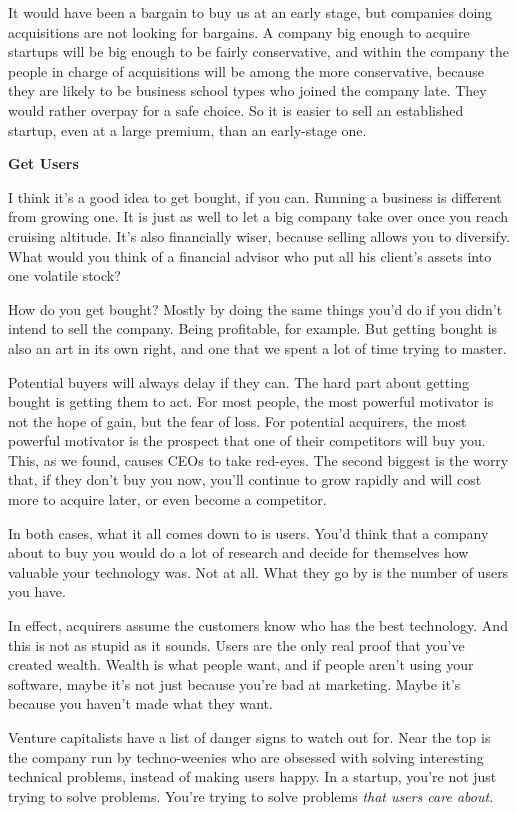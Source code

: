 It would have been a bargain to buy us at an early stage, but companies
doing acquisitions are not looking for bargains. A company big enough to
acquire startups will be big enough to be fairly conservative, and
within the company the people in charge of acquisitions will be among
the more conservative, because they are likely to be business school
types who joined the company late. They would rather overpay for a safe
choice. So it is easier to sell an established startup, even at a large
premium, than an early-stage one.

\textbf{Get Users}

I think it's a good idea to get bought, if you can. Running a business
is different from growing one. It is just as well to let a big company
take over once you reach cruising altitude. It's also financially wiser,
because selling allows you to diversify. What would you think of a
financial advisor who put all his client's assets into one volatile
stock?

How do you get bought? Mostly by doing the same things you'd do if you
didn't intend to sell the company. Being profitable, for example. But
getting bought is also an art in its own right, and one that we spent a
lot of time trying to master.

Potential buyers will always delay if they can. The hard part about
getting bought is getting them to act. For most people, the most
powerful motivator is not the hope of gain, but the fear of loss. For
potential acquirers, the most powerful motivator is the prospect that
one of their competitors will buy you. This, as we found, causes CEOs to
take red-eyes. The second biggest is the worry that, if they don't buy
you now, you'll continue to grow rapidly and will cost more to acquire
later, or even become a competitor.

In both cases, what it all comes down to is users. You'd think that a
company about to buy you would do a lot of research and decide for
themselves how valuable your technology was. Not at all. What they go by
is the number of users you have.

In effect, acquirers assume the customers know who has the best
technology. And this is not as stupid as it sounds. Users are the only
real proof that you've created wealth. Wealth is what people want, and
if people aren't using your software, maybe it's not just because you're
bad at marketing. Maybe it's because you haven't made what they want.

Venture capitalists have a list of danger signs to watch out for. Near
the top is the company run by techno-weenies who are obsessed with
solving interesting technical problems, instead of making users happy.
In a startup, you're not just trying to solve problems. You're trying to
solve problems \emph{that users care about.}


